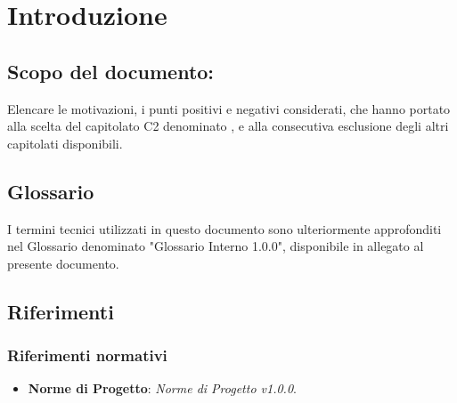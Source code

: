 \section{Introduzione}

\subsection{Scopo del documento:}
Elencare le motivazioni, i punti positivi e negativi considerati, che hanno portato alla scelta del capitolato C2 denominato \NomeProgetto, e alla consecutiva esclusione degli altri capitolati disponibili.

\subsection{Glossario}
I termini tecnici utilizzati in questo documento sono ulteriormente approfonditi nel Glossario denominato "Glossario Interno 1.0.0", disponibile in allegato al presente documento.

\subsection{Riferimenti}

	\subsubsection{Riferimenti normativi}
	\begin{itemize}
		\item \textbf{Norme di Progetto}: \textit{Norme di Progetto v1.0.0}.
	\end{itemize}
	
	

